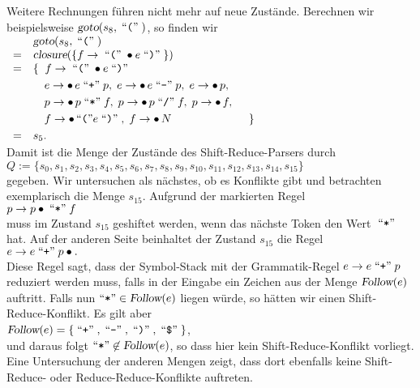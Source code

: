 Weitere Rechnungen f\"uhren nicht mehr auf neue Zust\"ande.  Berechnen wir beispielsweise
$\textsl{goto}(s_8, \;\mbox{``\texttt{(}''}\;)$, so finden wir
\\[0.2cm]
\hspace*{1.3cm}
$ 
\begin{array}{cl}
    & \textsl{goto}(s_8, \;\mbox{``\texttt{(}''}\;) \\
  = & \textsl{closure}(\{ f \rightarrow \;\mbox{``\texttt{(}''}\; \bullet e \;\mbox{``\texttt{)}''}\; \}) \\
  = & \{\;\; f \rightarrow \;\mbox{``\texttt{(}''}\; \bullet e \;\mbox{``\texttt{)}''}\; \\[0.1cm]
    & \quad e \rightarrow \bullet\, e \;\mbox{``\texttt{+}''}\; p,\; 
            e \rightarrow \bullet\, e \;\mbox{``\texttt{-}''}\; p,\;
            e \rightarrow \bullet\, p,                  \\[0.1cm]
    & \quad p \rightarrow \bullet\, p \;\mbox{``\texttt{*}''}\; f,\;
            p \rightarrow \bullet\, p \;\mbox{``\texttt{/}''}\; f,\;
            p \rightarrow \bullet\, f,                \\[0.1cm]
    & \quad f \rightarrow \bullet\, \mbox{``\texttt{(}''} e \;\mbox{``\texttt{)}''}\;,\;
            f \rightarrow \bullet\, N   \hspace*{2.4cm} \} \\[0.1cm]
  = & s_5.
\end{array}
$
\\[0.2cm]
Damit ist die Menge der Zust\"ande des Shift-Reduce-Parsers durch
\\[0.2cm]
\hspace*{1.3cm}
$ Q := \{ s_0, s_1, s_2, s_3, s_4, s_5, s_6, s_7, s_8, s_9, s_{10}, s_{11}, s_{12}, s_{13}, s_{14}, s_{15} \} $
\\[0.2cm]
gegeben.  Wir untersuchen als n\"achstes, ob es Konflikte gibt und betrachten exemplarisch die 
Menge $s_{15}$.  Aufgrund der markierten Regel 
\\[0.2cm]
\hspace*{1.3cm}
$ p \rightarrow p \bullet \;\mbox{``\texttt{*}''}\; f $
\\[0.2cm]
muss im Zustand $s_{15}$ geshiftet werden, wenn das n\"achste Token den Wert $\;\mbox{``\texttt{*}''}\;$ hat.
Auf der anderen Seite beinhaltet der Zustand $s_{15}$ die Regel
\\[0.2cm]
\hspace*{1.3cm}
$ e \rightarrow e \;\mbox{``\texttt{+}''}\; p \bullet. $
\\[0.2cm]
Diese Regel sagt, dass der Symbol-Stack mit der Grammatik-Regel $e \rightarrow e \;\mbox{``\texttt{+}''}\; p$ reduziert
werden muss, falls in der Eingabe ein Zeichen aus der Menge $\textsl{Follow}(e)$ auftritt.
Falls nun $\mbox{``\texttt{*}''} \in \textsl{Follow}(e)$ liegen w\"urde, so h\"atten wir einen Shift-Reduce-Konflikt.
Es gilt aber 
\\[0.2cm]
\hspace*{1.3cm}
$ \textsl{Follow}(e) = \{ \quoted{+}, \quoted{-}, \quoted{)} ,\quoted{\symbol{36}} \} $,
\\[0.2cm]
und daraus folgt $\mbox{``\texttt{*}''} \not\in \textsl{Follow}(e)$, so dass hier kein Shift-Reduce-Konflikt
vorliegt.  Eine Untersuchung der anderen Mengen zeigt, dass dort ebenfalls keine Shift-Reduce- oder
Reduce-Reduce-Konflikte auftreten.

